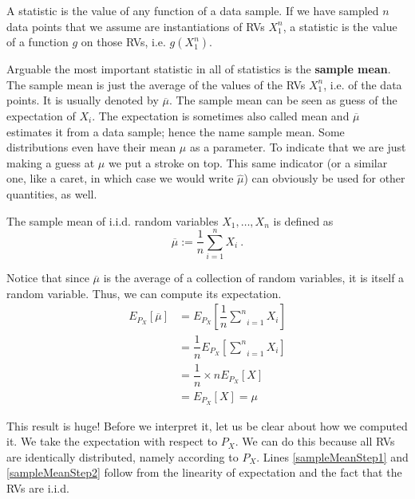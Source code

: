 \begin{Definition}
A statistic is the value of any function of a data sample. If we have sampled $ n $ data points that we assume are instantiations of RVs
$ X_{1}^{n} $, a statistic is the value of a function $ g $ on those RVs, i.e. $ g(X_{1}^{n}) $.
\end{Definition}

Arguable the most important statistic in all of statistics is the \textbf{sample mean}. The sample mean is just the average of the
values of the RVs $ X_{1}^{n} $, i.e. of the data points. It is usually denoted by $ \overline{\mu} $. The
sample mean can be seen as guess of the expectation of $ X_{i} $. The expectation is sometimes also
called mean and $ \overline{\mu} $ estimates it from a data sample; hence the name sample mean. Some distributions even have their
mean $ \mu $ as a parameter. To indicate that we are just making a guess at $ \mu $ we put a stroke on top.
This same indicator (or a similar one, like a caret, in which case we would write $ \hat{\mu} $) can obviously be used for other quantities, as well.

\begin{Definition}
The sample mean of i.i.d. random variables $ X_{1}, \ldots, X_{n} $ is defined as 
$$ \overline{\mu} := \dfrac{1}{n}\underset{i=1}{\overset{n}{\sum}} X_{i} \ . $$
\end{Definition}

Notice that since $ \overline{\mu} $ is the average of a collection of random variables, it is itself a random variable. Thus, we can
compute its expectation.
\begin{align}
E_{P_{X}}[\overline{\mu}] &= E_{P_{X}}\left[\dfrac{1}{n} \underset{i=1}{\overset{n}{\sum}} X_{i}\right] \\
&= \dfrac{1}{n} E_{P_{X}}\left[\underset{i=1}{\overset{n}{\sum}} X_{i}\right] \label{sampleMeanStep1} \\
&= \dfrac{1}{n} \times n E_{P_{X}}[X] \label{sampleMeanStep2} \\
&= E_{P_{X}}[X] = \mu
\end{align}

This result is huge! Before we interpret it, let us be clear about how we computed it. We take the expectation with respect to
$ P_{X} $. We can do this because all RVs are identically distributed, namely according to $ P_{X} $. Lines \ref{sampleMeanStep1} and
\ref{sampleMeanStep2} follow from the linearity of expectation and the fact that the RVs are i.i.d. 

